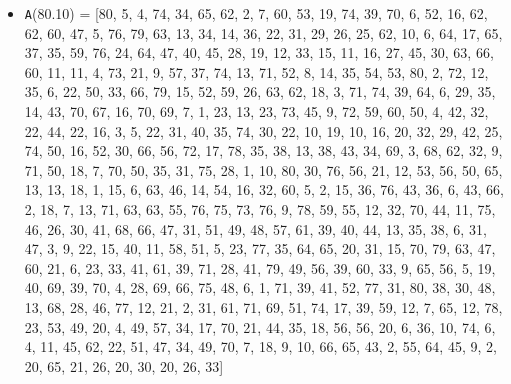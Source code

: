 \documentclass[runningheads, a4paper]{llncs}
\begin{document}
\begin{itemize}
	\item {\texttt A(80.10) = } [80, 5, 4, 74, 34, 65, 62, 2, 7, 60, 53, 19, 74, 39, 70, 6, 52, 16, 62, 62, 60, 47, 5, 76, 79, 63, 13, 34, 14, 36, 22, 31, 29, 26, 25, 62, 10, 6, 64, 17, 65, 37, 35, 59, 76, 24, 64, 47, 40, 45, 28, 19, 12, 33, 15, 11, 16, 27, 45, 30, 63, 66, 60, 11, 11, 4, 73, 21, 9, 57, 37, 74, 13, 71, 52, 8, 14, 35, 54, 53, 80, 2, 72, 12, 35, 6, 22, 50, 33, 66, 79, 15, 52, 59, 26, 63, 62, 18, 3, 71, 74, 39, 64, 6, 29, 35, 14, 43, 70, 67, 16, 70, 69, 7, 1, 23, 13, 23, 73, 45, 9, 72, 59, 60, 50, 4, 42, 32, 22, 44, 22, 16, 3, 5, 22, 31, 40, 35, 74, 30, 22, 10, 19, 10, 16, 20, 32, 29, 42, 25, 74, 50, 16, 52, 30, 66, 56, 72, 17, 78, 35, 38, 13, 38, 43, 34, 69, 3, 68, 62, 32, 9, 71, 50, 18, 7, 70, 50, 35, 31, 75, 28, 1, 10, 80, 30, 76, 56, 21, 12, 53, 56, 50, 65, 13, 13, 18, 1, 15, 6, 63, 46, 14, 54, 16, 32, 60, 5, 2, 15, 36, 76, 43, 36, 6, 43, 66, 2, 18, 7, 13, 71, 63, 63, 55, 76, 75, 73, 76, 9, 78, 59, 55, 12, 32, 70, 44, 11, 75, 46, 26, 30, 41, 68, 66, 47, 31, 51, 49, 48, 57, 61, 39, 40, 44, 13, 35, 38, 6, 31, 47, 3, 9, 22, 15, 40, 11, 58, 51, 5, 23, 77, 35, 64, 65, 20, 31, 15, 70, 79, 63, 47, 60, 21, 6, 23, 33, 41, 61, 39, 71, 28, 41, 79, 49, 56, 39, 60, 33, 9, 65, 56, 5, 19, 40, 69, 39, 70, 4, 28, 69, 66, 75, 48, 6, 1, 71, 39, 41, 52, 77, 31, 80, 38, 30, 48, 13, 68, 28, 46, 77, 12, 21, 2, 31, 61, 71, 69, 51, 74, 17, 39, 59, 12, 7, 65, 12, 78, 23, 53, 49, 20, 4, 49, 57, 34, 17, 70, 21, 44, 35, 18, 56, 56, 20, 6, 36, 10, 74, 6, 4, 11, 45, 62, 22, 51, 47, 34, 49, 70, 7, 18, 9, 10, 66, 65, 43, 2, 55, 64, 45, 9, 2, 20, 65, 21, 26, 20, 30, 20, 26, 33]
\end{itemize}


\begin{thebibliography}{4}


\end{thebibliography}
\end{document}
